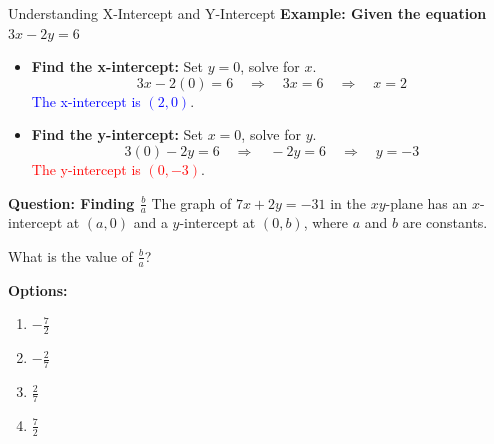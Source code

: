 \documentclass{beamer}
\begin{document}
\begin{frame}{Understanding X-Intercept and Y-Intercept}
    \textbf{Example: Given the equation \( 3x - 2y = 6 \)}
    \begin{itemize}
        \item \textbf{Find the x-intercept:} Set \( y = 0 \), solve for \( x \).
        \[
        3x - 2(0) = 6  \quad \Rightarrow \quad 3x = 6 \quad \Rightarrow \quad x = 2
        \]
        \textcolor{blue}{The x-intercept is \( (2, 0) \)}.
        
        \item \textbf{Find the y-intercept:} Set \( x = 0 \), solve for \( y \).
        \[
        3(0) - 2y = 6  \quad \Rightarrow \quad -2y = 6 \quad \Rightarrow \quad y = -3
        \]
        \textcolor{red}{The y-intercept is \( (0, -3) \)}.
    \end{itemize}
    
\end{frame}

\begin{frame}{\textbf{Question: Finding \( \frac{b}{a} \)}}
    The graph of \( 7x + 2y = -31 \) in the \( xy \)-plane has an \( x \)-intercept at \( (a, 0) \) and a \( y \)-intercept at \( (0, b) \), where \( a \) and \( b \) are constants.  

    \vspace{0.3cm}
    What is the value of \( \frac{b}{a} \)?

    \vspace{0.5cm}
    \textbf{Options:}
    \begin{enumerate}
        \item[A.] \( -\frac{7}{2} \)
        \item[B.] \( -\frac{2}{7} \)
        \item[C.] \( \frac{2}{7} \)
        \item[D.] \( \frac{7}{2} \)
    \end{enumerate}
\end{frame}
\end{document}
